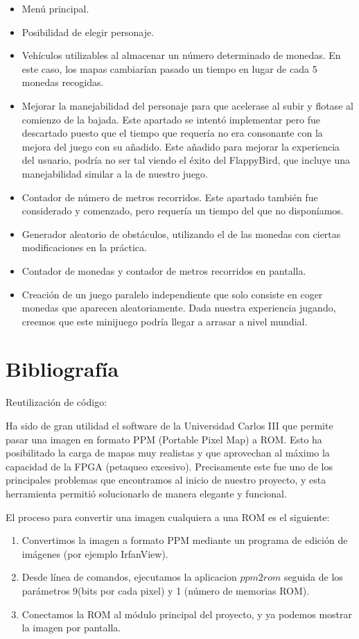 \documentclass[11pt, a4paper, spanish, openright, twoside]{book}
\begin{document}
\begin{itemize}
	\item Menú principal.
	\item Posibilidad de elegir personaje.
	\item Vehículos utilizables al almacenar un número determinado de monedas. En este caso, los mapas cambiarían pasado un tiempo en lugar de cada 5 monedas recogidas.
	\item Mejorar la  manejabilidad del personaje para que acelerase al subir y flotase al comienzo de la bajada. 
	Este apartado se intentó implementar pero fue descartado puesto que el tiempo que requería no era consonante con la mejora del juego con su añadido.
	Este añadido  para mejorar la experiencia del usuario, podría no ser tal viendo el éxito del FlappyBird, que incluye una manejabilidad similar a la de nuestro juego.
	\item Contador de número de metros recorridos. Este apartado también fue considerado y comenzado, pero requería un tiempo del que no disponíamos.
	\item Generador aleatorio de obstáculos, utilizando el de las monedas con ciertas modificaciones en la práctica.
	\item Contador de monedas y contador de metros recorridos en pantalla.
	\item Creación de un juego paralelo independiente que solo consiste en coger monedas que aparecen aleatoriamente. Dada nuestra experiencia jugando, creemos que este minijuego podría llegar a arrasar a nivel mundial.
\end{itemize}


\section{Bibliografía}
Reutilización de código:

Ha sido de gran utilidad el software de la Universidad Carlos III que permite pasar una imagen en formato PPM (Portable Pixel Map) a ROM. Esto ha posibilitado la carga de mapas muy realistas y que aprovechan al máximo la capacidad de la FPGA (petaqueo excesivo).
Precisamente este fue uno de los principales problemas que encontramos al inicio de nuestro proyecto, y esta herramienta permitió solucionarlo de manera elegante y funcional. 

El proceso para convertir una imagen cualquiera a una ROM es el siguiente:
\begin{enumerate}
\item Convertimos la imagen a formato PPM mediante un programa de edición de imágenes (por ejemplo IrfanView).
\item Desde línea de comandos, ejecutamos la aplicacion $ppm2rom$ seguida de los parámetros 9(bits por cada pixel) y 1 (número de memorias ROM).
\item Conectamos la ROM al módulo principal del proyecto, y ya podemos mostrar la imagen por pantalla.
\end{enumerate}
\end{document}
